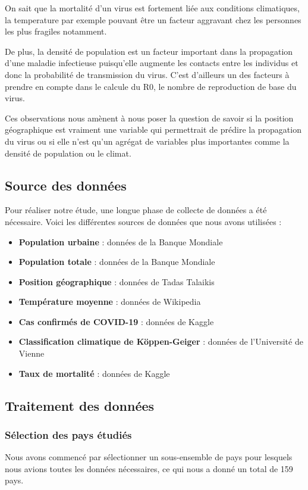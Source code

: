 \documentclass[12pt]{iEEEtran}
\begin{document}
On sait que la mortalité d'un virus est fortement liée aux conditions climatiques,
la temperature par exemple pouvant être un facteur aggravant chez les personnes
les plus fragiles notamment. \cite{climate_mortality}

De plus, la densité de population est un facteur important dans la propagation d'une maladie
infectieuse puisqu'elle augmente les contacts entre les individus et donc la probabilité
de transmission du virus. C'est d'ailleurs un des facteurs à prendre en compte dans le calcule
du R0, le nombre de reproduction de base du virus. \cite{R0_wiki} \cite{sy2021population}

Ces observations nous amènent à nous poser la question de savoir si la position géographique
est vraiment une variable qui permettrait de prédire la propagation du virus ou si elle n'est qu'un
agrégat de variables plus importantes comme la densité de population ou le climat.

\subsection{Source des données}
Pour réaliser notre étude, une longue phase de collecte de données a été nécessaire. Voici les
différentes sources de données que nous avons utilisées :
\begin{itemize}
    \item \textbf{Population urbaine} : données de la Banque Mondiale \cite{urban_pop}
    \item \textbf{Population totale} : données de la Banque Mondiale \cite{total_pop}
    \item \textbf{Position géographique} : données de Tadas Talaikis \cite{country_pos}
    \item \textbf{Température moyenne} : données de Wikipedia \cite{mean_temp}
    \item \textbf{Cas confirmés de COVID-19} : données de Kaggle \cite{covid_confirmed}
    \item \textbf{Classification climatique de Köppen-Geiger} : données de l'Université de Vienne \cite{climate_classification}
    \item \textbf{Taux de mortalité} : données de Kaggle \cite{mortality_rate}
\end{itemize}

\subsection{Traitement des données}
\subsubsection{Sélection des pays étudiés}
Nous avons commencé par sélectionner un sous-ensemble de pays pour lesquels nous avions toutes
les données nécessaires, ce qui nous a donné un total de 159 pays.
\end{document}
